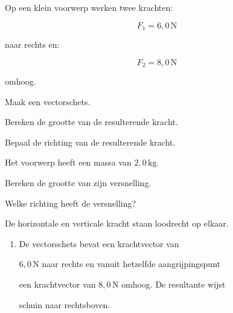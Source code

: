 \documentclass{ximera}
\begin{document}
\begin{oefening}{\oefU\ESS}

Op een klein voorwerp werken twee krachten:

\[F_1=6{,}0\,\mathrm N\]

naar rechts en:

\[F_2=8{,}0\,\mathrm N\]

omhoog.

\begin{question}

Maak een vectorschets.

\end{question}

\begin{question}

Bereken de grootte van de resulterende kracht.

\end{question}

\begin{question}

Bepaal de richting van de resulterende kracht.

\end{question}

\begin{question}

Het voorwerp heeft een massa van $2{,}0\,\mathrm{kg}$.

Bereken de grootte van zijn versnelling.

\end{question}

\begin{question}

Welke richting heeft de versnelling?

\end{question}


\begin{oplossing}

De horizontale en verticale kracht staan loodrecht op elkaar.

\begin{enumerate}

  \item De vectorschets bevat een krachtvector van

  $6{,}0\,\mathrm N$ naar rechts en vanuit hetzelfde aangrijpingspunt

  een krachtvector van $8{,}0\,\mathrm N$ omhoog. De resultante wijst

  schuin naar rechtsboven.


\end{enumerate}
\end{oplossing}
\end{oefening}
\end{document}
